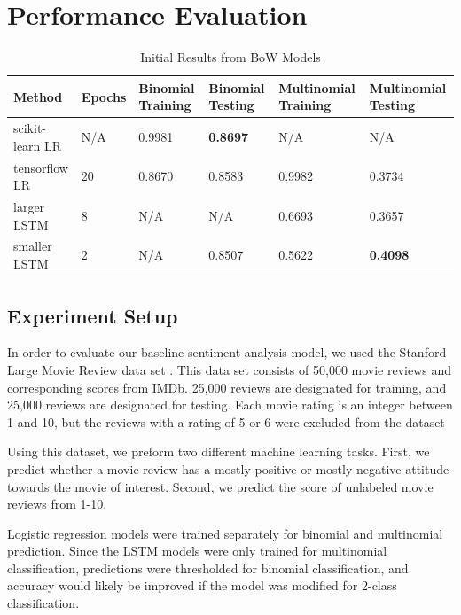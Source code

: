 \documentclass[conference]{IEEEtran}
\begin{document}
\section{Performance Evaluation}
\label{performance}
    \begin{table}[]
        \centering
        \caption{Initial Results from BoW Models}
        \label{my-label}
        \begin{tabularx}{\textwidth}{ X X X  X X  X }
        \toprule
        Method & Epochs & Binomial Training & Binomial Testing & Multinomial Training & Multinomial Testing \\
        \midrule
        scikit-learn LR & N/A & 0.9981 & \textbf{0.8697} & N/A & N/A \\
        tensorflow LR & 20 &  0.8670 & 0.8583 & 0.9982 & 0.3734 \\
        larger LSTM & 8 & N/A & N/A & 0.6693 & 0.3657 \\
        smaller LSTM  & 2 & N/A    & 0.8507 & 0.5622   & \textbf{0.4098} \\
        \bottomrule
        \end{tabularx}
    \end{table}
\subsection{Experiment Setup}
    In order to evaluate our baseline sentiment analysis model, we used the
    Stanford Large Movie Review data set \cite{maas2011learning}. This data
    set consists of 50,000 movie reviews and corresponding scores from IMDb.
    25,000 reviews are designated for training, and 25,000 reviews are designated for testing.
    Each movie rating is an integer between 1 and 10, but the reviews with a rating
    of 5 or 6 were excluded from the dataset
    
    Using this dataset, we preform
    two different machine learning tasks. First, we predict whether a movie review
    has a mostly positive or mostly negative attitude towards the movie of interest. 
    Second, we predict the score of unlabeled movie reviews from 1-10.
    
    Logistic regression models were trained separately for binomial and multinomial
    prediction. Since the LSTM models were  only trained 
    for multinomial classification, predictions were thresholded for binomial 
    classification, and accuracy would likely be improved if the model was modified
    for 2-class classification.
    
\end{document}
